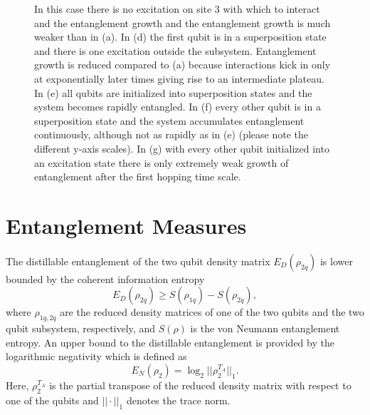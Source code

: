 \documentclass[8pt]{article}
\begin{document}
\begin{figure}[tbh]
{In this case there is no excitation on site 3 with which to interact and the entanglement growth and the entanglement growth is much weaker than in (a).
In (d) the first qubit is in a superposition state and there is one excitation outside the subsystem. Entanglement growth is reduced compared to (a) because interactions kick in only at exponentially later times giving rise to an intermediate plateau.
In (e) all qubits are initialized into superposition states and the system becomes rapidly entangled.
In (f) every other qubit is in a superposition state and the system accumulates entanglement continuously, although not as rapidly as in (e) (please note the different y-axis scales).
In (g) with every other qubit initialized into an excitation state there is only extremely weak growth of entanglement after the first hopping time scale.
}
\label{log_growth_initial_state_numerics}
\end{figure}
\afterpage{\FloatBarrier}


\section{Entanglement Measures}
The distillable entanglement of the two qubit density matrix $E_D(\rho_{2q})$ is lower bounded by the coherent information entropy
\begin{equation}
E_D(\rho_{2q}) \geq S(\rho_{1q}) - S(\rho_{2q}),
\end{equation}
where $\rho_{1q,2q}$ are the reduced density matrices of one of the two qubits and the two qubit subsystem, respectively, and $S(\rho)$ is the von Neumann entanglement entropy.
An upper bound to the distillable entanglement is provided by the logarithmic negativity\autocite{Vidal2002} which is defined as
\begin{equation}
E_N(\rho_2) = \log_2 || \rho_2^{T_A} ||_1.
\end{equation}
Here, $\rho_2^{T_A}$ is the partial transpose of the reduced density matrix with respect to one of the qubits and $|| \cdot ||_1$ denotes the trace norm.
\end{document}
